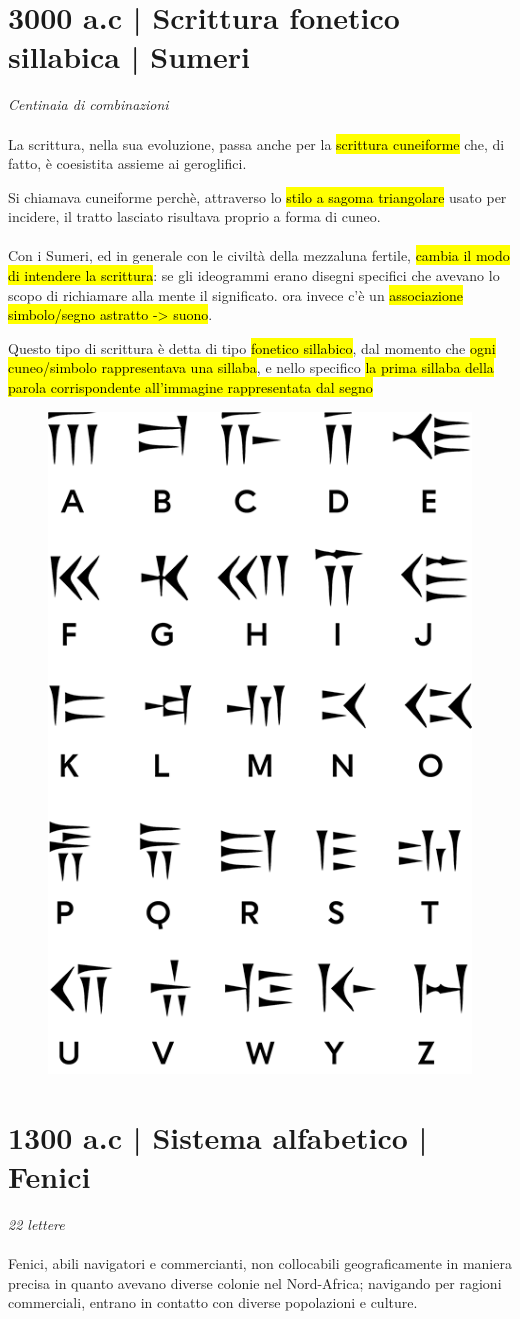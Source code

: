 \section{3000 a.c | Scrittura fonetico sillabica | Sumeri}
{\huge \textit{Centinaia di combinazioni}}\\\\
La scrittura, nella sua evoluzione, passa anche per la \hl{scrittura cuneiforme} che, di fatto, è coesistita assieme ai geroglifici. 

Si chiamava cuneiforme perchè, attraverso lo \hl{stilo a sagoma triangolare} usato per incidere, il tratto lasciato risultava proprio a forma di cuneo. 
\\\\
Con i Sumeri, ed in generale con le civiltà della mezzaluna fertile, \hl{cambia il modo di intendere la scrittura}: se gli  ideogrammi erano disegni specifici che avevano lo scopo di richiamare alla mente il significato. ora invece c'è un \hl{associazione simbolo/segno astratto -> suono}.

Questo tipo di scrittura è detta di tipo \hl{fonetico sillabico}, dal momento che \hl{ ogni cuneo/simbolo rappresentava una sillaba}, e nello specifico \hl{la prima sillaba della parola corrispondente all'immagine rappresentata dal segno}

\begin{figure}[H]
    \centering
    \includegraphics[width=0.3\linewidth]{blocco_3 - storia della scrittura/imgs/tabellaok.png}
\end{figure}

\section{1300 a.c | Sistema alfabetico | Fenici}
{\huge \textit{22 lettere}}\\\\
Fenici, abili navigatori e commercianti, non collocabili geograficamente in maniera precisa in quanto avevano diverse colonie nel Nord-Africa; navigando per ragioni commerciali, entrano in contatto con diverse popolazioni e culture. 

